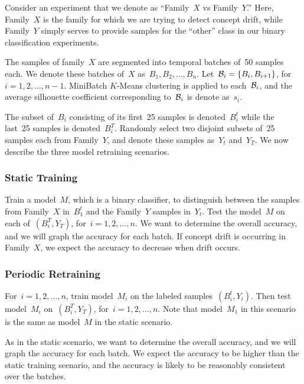 \documentclass[12pt]{article}
\begin{document}

Consider an experiment that we denote as ``Family~$X$ vs Family~$Y$.''
Here, Family~$X$ is the family for which we are trying to detect concept drift, 
while Family~$Y$ simply serves to provide samples for the ``other'' class
in our binary classification experiments. 

The samples of family~$X$ are segmented into temporal batches of~50 samples each.
We denote these batches of~$X$ as~$B_1,B_2,\ldots,B_n$. 
Let~${\cal B}_i = \{B_i,B_{i+1}\}$, for~$i=1,2,\ldots,n-1$.
MiniBatch $K$-Means clustering is applied to each~${\cal B}_i$, and the 
average silhouette coefficient corresponding to~${\cal B}_i$ is denote as~$s_i$. 

The subset of~$B_i$ consisting of its first~25 samples is denoted~$B_i^{t}$ 
while the last~25 samples is denoted~$B_i^{T}$. Randomly select two disjoint
subsets of~25 samples each from Family~$Y$, and denote these samples 
as~$Y_{t}$ and~$Y_{T}$. 
We now describe the three model retraining scenarios.

\subsubsection{Static Training}

Train a model~$M$, which is a binary classifier, to distinguish
between the samples from Family~$X$ in~$B^t_1$ and the Family~$Y$
samples in~$Y_t$.
Test the model~$M$ on each of~$(B^T_i,Y_T)$, for~$i=1,2,\ldots,n$. 
We want to determine the overall accuracy, 
and we will graph the accuracy for each batch. 
If concept drift is occurring in Family~$X$,
we expect the accuracy to decrease when drift occurs.

\subsubsection{Periodic Retraining}

For~$i=1,2,\ldots,n$, train model~$M_i$  
on the labeled samples~$(B^t_i,Y_i)$. 
Then test model~$M_i$ on~$(B^T_i,Y_T)$, for~$i=1,2,\ldots,n$. 
Note that model~$M_1$ in this scenario is the same as model~$M$ in the
static scenario.

As in the static scenario,
we want to determine the overall accuracy, and we will graph the accuracy for each batch.
We expect the accuracy to be higher than the static training scenario,
and the accuracy is likely to be reasonably consistent over the batches.
\end{document}
